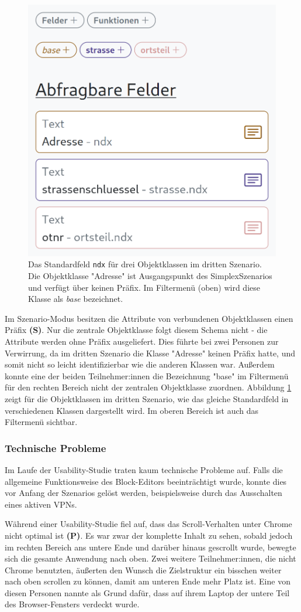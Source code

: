 \begin{figure}[!ht]
  \centering
  \includegraphics[width=.5\textwidth]{assets/scenario-prefixes.png}
  \caption{Das Standardfeld \texttt{ndx} für drei Objektklassen im dritten Szenario. Die Objektklasse "Adresse" ist Ausgangspunkt des SimplexSzenarios und verfügt über keinen Präfix. Im Filtermenü (oben) wird diese Klasse als \textit{base} bezeichnet.}
  \label{fig:scenario-prefixes}
\end{figure}
Im Szenario-Modus besitzen die Attribute von verbundenen Objektklassen einen Präfix \textbf{(S)}. Nur die zentrale Objektklasse folgt diesem Schema nicht - die Attribute werden ohne Präfix ausgeliefert. Dies führte bei zwei Personen zur Verwirrung, da im dritten Szenario die Klasse "Adresse" keinen Präfix hatte, und somit nicht so leicht identifizierbar wie die anderen Klassen war. Außerdem konnte eine der beiden Teilnehmer:innen die Bezeichnung "base" im Filtermenü für den rechten Bereich nicht der zentralen Objektklasse zuordnen. Abbildung \ref{fig:scenario-prefixes} zeigt für die Objektklassen im dritten Szenario, wie das gleiche Standardfeld in verschiedenen Klassen dargestellt wird. Im oberen Bereich ist auch das Filtermenü sichtbar.

\subsubsection{Technische Probleme}
Im Laufe der Usability-Studie traten kaum technische Probleme auf. Falls die allgemeine Funktionsweise des Block-Editors beeinträchtigt wurde, konnte dies vor Anfang der Szenarios gelöst werden, beispielsweise durch das Ausschalten eines aktiven \acs{VPN}s.

Während einer Usability-Studie fiel auf, dass das Scroll-Verhalten unter Chrome nicht optimal ist \textbf{(P)}. Es war zwar der komplette Inhalt zu sehen, sobald jedoch im rechten Bereich ans untere Ende und darüber hinaus gescrollt wurde, bewegte sich die gesamte Anwendung nach oben. Zwei weitere Teilnehmer:innen, die nicht Chrome benutzten, äußerten den Wunsch die Zielstruktur ein bisschen weiter nach oben scrollen zu können, damit am unteren Ende mehr Platz ist. Eine von diesen Personen nannte als Grund dafür, dass auf ihrem Laptop der untere Teil des Browser-Fensters verdeckt wurde.
